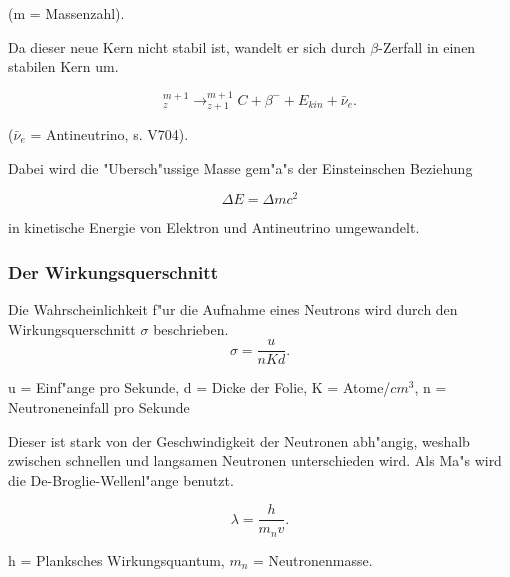 			\begin{center}
				\tiny{(m = Massenzahl).}
			\end{center}

			Da dieser neue Kern nicht stabil ist, wandelt er sich durch $\beta$-Zerfall in einen stabilen Kern um. 

			\begin{equation*}
				^{m+1}_z \rightarrow ^{m+1}_{z+1}C + \beta^- + E_{kin} + \bar{\nu}_e.
			\end{equation*}

			\begin{center}
				\tiny{($\bar{\nu}_e$ = Antineutrino, s. V704).}
			\end{center}

			Dabei wird die "Ubersch"ussige Masse gem"a"s der Einsteinschen Beziehung 

			\begin{equation*}
				\Delta E = \Delta m c^2
			\end{equation*}

			in kinetische Energie von Elektron und Antineutrino umgewandelt.

		\subsubsection{Der Wirkungsquerschnitt}
		\label{sub:der_wirkungsquerschnitt}
		
			Die Wahrscheinlichkeit f"ur die Aufnahme eines Neutrons wird durch den Wir\-kungs\-quer\-schnitt $\sigma$ beschrieben.
			\newpage
			\begin{equation*}
				\sigma = \frac{u}{nKd}.
			\end{equation*}

			\begin{center}
					\tiny{u = Einf"ange pro Sekunde, d = Dicke der Folie,
					K = Atome/$cm^3$, n = Neutroneneinfall pro Sekunde}
			\end{center}

			Dieser ist stark von der Geschwindigkeit der Neutronen abh"angig, weshalb zwischen schnellen und langsamen Neutronen unterschieden wird.
			Als Ma"s wird die De-Broglie-Wellenl"ange benutzt.

			\begin{equation*}
				\lambda = \frac{h}{m_n v}.
			\end{equation*}

			\begin{center}
					\tiny{h = Planksches Wirkungsquantum, $m_n$ = Neutronenmasse}.
			\end{center}

